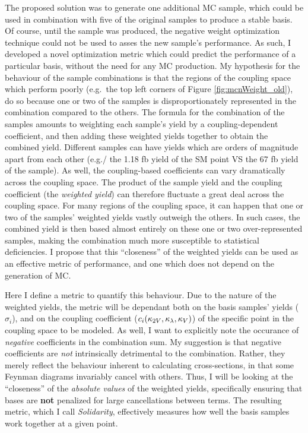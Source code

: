     The proposed solution was to generate one additional MC sample,
        which could be used in combination with five of the original samples to produce a stable basis.
    Of course, until the sample was produced, the negative weight optimization technique could not be used to asses the new sample's performance.
    As such, I developed a novel optimization metric which could predict the performance of a particular basis,
        without the need for any MC production.
    My hypothesis for the behaviour of the sample combinations is that the regions of the coupling space which perform poorly
        (e.g.\ the top left corners of Figure \ref{fig:mcnWeight_old}),
        do so because one or two of the samples is disproportionately represented in the combination compared to the others.
    The formula for the combination of the samples amounts to weighting each sample's yield by a coupling-dependent coefficient,
        and then adding these weighted yields together to obtain the combined yield.
    Different samples can have yields which are orders of magnitude apart from each other
        (e.g./ the 1.18 fb yield of the SM point VS the 67 fb yield of the  sample).
    As well, the coupling-based coefficients can vary dramatically across the coupling space.
    The product of the sample yield and the coupling coefficient (the \textit{weighted yield})
        can therefore fluctuate a great deal across the coupling space.
    For many regions of the coupling space, it can happen that one or two of the samples' weighted yields vastly outweigh the others.
    In such cases, the combined yield is then based almost entirely on these one or two over-represented samples,
        making the combination much more susceptible to statistical deficiencies.
    I propose that this ``closeness'' of the weighted yields can be used as an effective metric of performance,
        and one which does not depend on the generation of MC.

    Here I define a metric to quantify this behaviour.
    Due to the nature of the weighted yields,
        the metric will be dependant both on the basis samples' yields ($\sigma_i$),
        and on the coupling coefficient ($c_i(\kappa_{2V},\kappa_{\lambda},\kappa_{V})$) of the specific point in the coupling space to be modeled.
    As well, I want to explicitly note the occurance of \textit{negative} coefficients in the combination sum.
    My suggestion is that negative coefficients are \textit{not} intrinsically detrimental to the combination.
    Rather, they merely reflect the behaviour inherent to calculating cross-sections,
        in that some Feynman diagrams invariably cancel with others.
    Thus, I will be looking at the ``closeness'' of the \textit{absolute values} of the weighted yields,
        specifically ensuring that bases are \textbf{not} penalized for large cancellations between terms.
    The resulting metric, which I call \textit{Solidarity}, effectively measures how well the basis samples work together at a given point.

